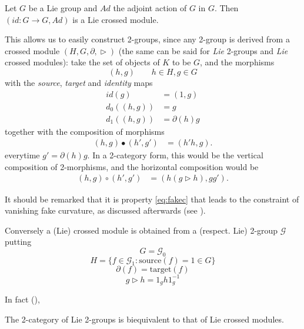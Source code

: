 \begin{example}\label{trivcross}
 Let $G$ be a Lie group and $Ad$ the adjoint action of $G$ in $G$. Then $(id:G\rightarrow G,Ad)$ is a Lie crossed module.
\end{example}
\label{passage}
This allows us to easily construct 2-groups, since any 2-group is derived from a crossed module $(H,G,\partial,\vartriangleright)$ (the same can be said for \emph{Lie} 2-groups and \emph{Lie} crossed modules): take the set of objects of $K$ to be $G$, and the morphisms \[ (h,g)\qquad h\in H, g\in G                                                                                                                                                                          \]
with the \emph{source}, \emph{target} and \emph{identity} maps \begin{align}
id(g)&=(1,g)\\
                                               d_0((h,g))&=g\\
						d_1((h,g))&=\partial(h)g \label{eq:fakec}
                                              \end{align}
together with the composition of morphisms \begin{align*}
                                            (h,g)\bullet(h',g')&=(h'h,g).
                                           \end{align*}
everytime $g'=\partial(h)g$. In a 2-category form, this would be the vertical composition of 2-morphisms, and the horizontal composition would be \begin{align*}
(h,g)\circ(h',g')&=(h (g\vartriangleright h),gg').
                                                       \end{align*}

It should be remarked that it is property \ref{eq:fakec} that leads to the constraint of vanishing fake curvature, as discussed afterwards (see \cite[p. 16]{baez-2004}).

Conversely a (Lie) crossed module is obtained from a (respect. Lie) 2-group $\mathcal{G}$ putting
\[  G=\mathcal{G}_0\]
\[H=\{ f\in \mathcal{G}_1: \text{source}(f)=1\in G\} \]
\[ \partial(f)=\text{target}(f)\]
\[g \vartriangleright h=1_g h 1_g^{-1}\]

In fact (\cite[p. 10]{baezhigher}), 
\begin{theorem}
 The 2-category of Lie 2-groups is biequivalent to that of Lie crossed modules.
\end{theorem}


